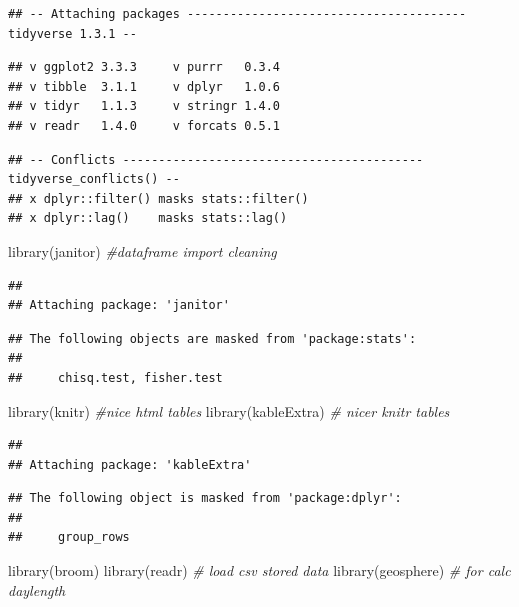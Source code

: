 \documentclass[
]{book}
\newenvironment{Shaded}{\begin{snugshade}}{\end{snugshade}}
\newcommand{\CommentTok}[1]{\textcolor[rgb]{0.56,0.35,0.01}{\textit{#1}}}
\newcommand{\FunctionTok}[1]{\textcolor[rgb]{0.00,0.00,0.00}{#1}}
\newcommand{\NormalTok}[1]{#1}
\begin{document}
\begin{verbatim}
## -- Attaching packages --------------------------------------- tidyverse 1.3.1 --
\end{verbatim}

\begin{verbatim}
## v ggplot2 3.3.3     v purrr   0.3.4
## v tibble  3.1.1     v dplyr   1.0.6
## v tidyr   1.1.3     v stringr 1.4.0
## v readr   1.4.0     v forcats 0.5.1
\end{verbatim}

\begin{verbatim}
## -- Conflicts ------------------------------------------ tidyverse_conflicts() --
## x dplyr::filter() masks stats::filter()
## x dplyr::lag()    masks stats::lag()
\end{verbatim}

\begin{Shaded}
\begin{Highlighting}[]
\FunctionTok{library}\NormalTok{(janitor) }\CommentTok{\#dataframe import cleaning}
\end{Highlighting}
\end{Shaded}

\begin{verbatim}
## 
## Attaching package: 'janitor'
\end{verbatim}

\begin{verbatim}
## The following objects are masked from 'package:stats':
## 
##     chisq.test, fisher.test
\end{verbatim}

\begin{Shaded}
\begin{Highlighting}[]
\FunctionTok{library}\NormalTok{(knitr) }\CommentTok{\#nice html tables}
\FunctionTok{library}\NormalTok{(kableExtra) }\CommentTok{\# nicer knitr tables}
\end{Highlighting}
\end{Shaded}

\begin{verbatim}
## 
## Attaching package: 'kableExtra'
\end{verbatim}

\begin{verbatim}
## The following object is masked from 'package:dplyr':
## 
##     group_rows
\end{verbatim}

\begin{Shaded}
\begin{Highlighting}[]
\FunctionTok{library}\NormalTok{(broom)}
\FunctionTok{library}\NormalTok{(readr) }\CommentTok{\# load csv stored data}
\FunctionTok{library}\NormalTok{(geosphere) }\CommentTok{\# for calc daylength}
\end{Highlighting}
\end{Shaded}
\end{document}
